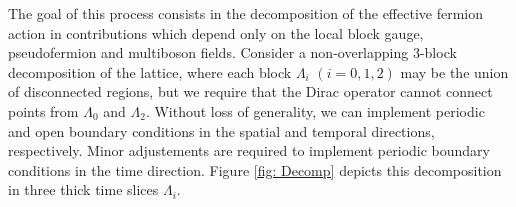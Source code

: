  The goal of this process consists in the decomposition of the effective fermion action in contributions which depend only on the local block gauge, pseudofermion and multiboson fields.
 Consider a non-overlapping 3-block decomposition of the lattice, where each block $\Lambda_i$ $(i = 0, 1, 2)$ may be the union of disconnected regions, but we require that the Dirac operator cannot connect points from $\Lambda_0$ and $\Lambda_2$. Without loss of generality, we can implement periodic and open boundary conditions in the spatial and temporal directions, respectively. Minor adjustements are required to implement periodic boundary conditions in the time direction. Figure \eqref{fig: Decomp} depicts this decomposition in three thick time slices $\Lambda_i$. 
 \begin{figure}
     \centering



\begin{tikzpicture}[x=0.75pt,y=0.75pt,yscale=-1,xscale=1]


\end{tikzpicture}
\end{figure}
